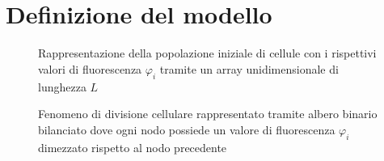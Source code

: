 \section{Definizione del modello}
\begin{figure}[h]
    \centering
    \caption{Rappresentazione della popolazione iniziale di cellule con i rispettivi
        valori di fluorescenza $\varphi_{i}$ tramite un array unidimensionale
        di lunghezza $L$}
    \label{fig:population-array}
\end{figure}
\begin{figure}[h]
\centering
{}
\caption{Fenomeno di divisione cellulare rappresentato tramite albero
    binario bilanciato dove ogni nodo possiede un valore di fluorescenza
    $\varphi_{i}$ dimezzato rispetto al nodo precedente}
\label{fig:proliferation-tree}
\end{figure}
